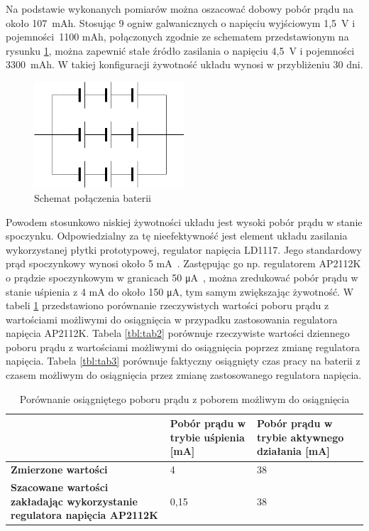         Na podstawie wykonanych pomiarów można oszacować dobowy pobór prądu na około 107~mAh. Stosując 9 ogniw galwanicznych o napięciu wyjściowym 1,5~V i pojemności~1100 mAh, połączonych zgodnie ze schematem przedstawionym na rysunku \ref{fig:battery_layout}, można zapewnić stałe źródło zasilania o napięciu 4,5~V i pojemności 3300~mAh. W takiej konfiguracji żywotność układu wynosi w przybliżeniu 30 dni.

        \begin{figure}[]
            \centering
            \includegraphics[width=0.5\textwidth]{chapters/images/battery_layout.png}
            \caption{Schemat połączenia baterii}
            \label{fig:battery_layout}
        \end{figure}

        Powodem stosunkowo niskiej żywotności układu jest wysoki pobór prądu w stanie spoczynku. Odpowiedzialny za tę nieefektywność jest element układu zasilania wykorzystanej płytki prototypowej, regulator napięcia LD1117. Jego standardowy prąd spoczynkowy wynosi około 5 mA~\cite{AMS1117-ds}. Zastępując go np. regulatorem AP2112K o prądzie spoczynkowym w granicach 50 μA~\cite{AP2112K-ds}, można zredukować pobór prądu w stanie uśpienia z 4 mA do około 150 μA, tym samym zwiększając żywotność. W tabeli \ref{tbl:tab1} przedstawiono porównanie rzeczywistych wartości poboru prądu z wartościami możliwymi do osiągnięcia w przypadku zastosowania regulatora napięcia AP2112K. Tabela \ref{tbl:tab2} porównuje rzeczywiste wartości dziennego poboru prądu z wartościami możliwymi do osiągnięcia poprzez zmianę regulatora napięcia. Tabela \ref{tbl:tab3} porównuje faktyczny osiągnięty czas pracy na baterii z czasem możliwym do osiągnięcia przez zmianę zastosowanego regulatora napięcia.


        \begin{table}[]
            \caption{Porównanie osiągniętego poboru prądu z poborem możliwym do osiągnięcia}
            \centering
            \begin{tabular}{p{6cm}|p{4cm}|p{4cm} }
                    & \textbf{Pobór prądu w trybie uśpienia [mA]} & \textbf{Pobór prądu w trybie aktywnego działania [mA]} \\ \hline
             \textbf{Zmierzone wartości}
                      & 4 & 38 \\
            \hline
            \textbf{Szacowane wartości zakładając wykorzystanie regulatora napięcia AP2112K} &  0,15 & 38  \\
            \end{tabular}
            \label{tbl:tab1}
            \vspace{10mm}
        \end{table}

